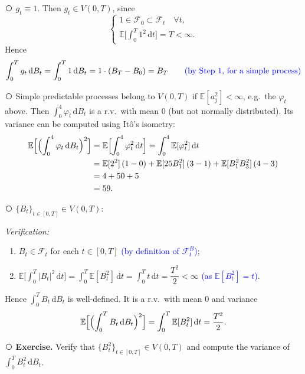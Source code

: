 \documentclass[11pt]{article}
\newcommand{\E}{\mathbb{E}}
\newcommand{\F}{\mathcal{F}}
\newcommand{\dd}{\,\mathrm{d}}
\newcommand{\cnum}[1]{\textcircled{\raisebox{-0.6pt}{\scriptsize #1}}} %
\newcommand{\ann}[1]{\textcolor{blue}{#1}}
\theoremstyle{definition}
\theoremstyle{plain}
\begin{document}
\noindent\cnum{1} $g_t\equiv1$. Then $g_t\in V(0,T)$, since
\[
  \begin{cases}
    1\in\F_0\subset\F_t \quad \forall t,\\[2pt]
    \E\bigl[\int_0^T1^2\dd t\bigr]=T<\infty .
  \end{cases}
\]
Hence
\[
  \int_0^Tg_t\dd B_t=\int_0^T1\dd B_t=1\cdot(B_T-B_0)=B_T
  \qquad \ann{\text{(by Step 1, for a simple process)}}
\]
\begin{center}
\end{center}

\medskip
\noindent\cnum{2} Simple predictable processes belong to $V(0,T)$ if $\E[a_j^2]<\infty$,
e.g.\ the $\varphi_t$ above. Then $\int_0^4\varphi_t\dd B_t$ is a r.v.\ with mean $0$
(but not normally distributed). Its variance can be computed using It\^o's isometry:
\begin{align*}
  \E\Bigl[\Bigl(\int_0^4\varphi_t\dd B_t\Bigr)^2\Bigr]
    &= \E\Bigl[\int_0^4\varphi_t^2\dd t\Bigr]
     = \int_0^4\E[\varphi_t^2]\dd t\\
    &= \E[2^2]\,(1-0)+\E[25B_1^2]\,(3-1)+\E[B_1^2B_3^2]\,(4-3)\\
    &= 4+50+5\\
    &= 59 .
\end{align*}

\medskip
\noindent\cnum{3} $\{B_t\}_{t\in[0,T]}\in V(0,T)$:

\noindent\emph{Verification:}
\begin{enumerate}
\item[(1)] $B_t\in\F_t$ for each $t\in[0,T]$ \ann{(by definition of $\F_t^B$)};
\item[(2)] $\E\bigl[\int_0^T|B_t|^2\dd t\bigr]=\int_0^T\E[B_t^2]\dd t=\int_0^Tt\dd t
      =\dfrac{T^2}{2}<\infty$ \ann{(as $\E[B_t^2]=t$)}.
\end{enumerate}
Hence $\int_0^TB_t\dd B_t$ is well-defined. It is a r.v.\ with mean $0$ and variance
\[
  \E\Bigl[\Bigl(\int_0^TB_t\dd B_t\Bigr)^2\Bigr]=\int_0^T\E[B_t^2]\dd t=\frac{T^2}{2} .
\]

\medskip
\noindent\cnum{4} \textbf{Exercise.} Verify that $\{B_t^2\}_{t\in[0,T]}\in V(0,T)$ and
compute the variance of $\int_0^TB_t^2\dd B_t$.
\end{document}

